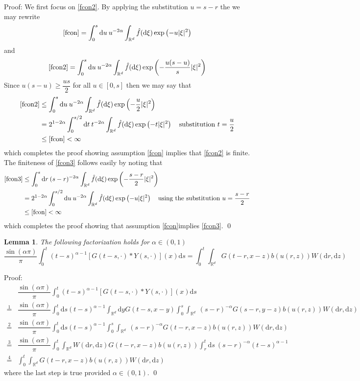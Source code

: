 \documentclass{article}
\newtheorem{lemma}{Lemma}[section]
\numberwithin{equation}{section}
\newcommand{\R}{\mathbb{R}}
\newcommand{\ud}{\ensuremath{\mathrm{d}}}
\begin{document}
Proof: We first focus on \eqref{fcon2}. By applying the substitution $u=s-r$ the we may rewrite 
$$ \ref{fcon} = \int_0^s \ud u \: u^{-2\alpha} \int_{\R^d} \hat{f}(\ud \xi) \exp\left( -u|\xi|^2 \right)  $$ 
and 
$$ \eqref{fcon2} = \int_0^s \ud u \: u^{-2\alpha} \int_{\R^d} \hat{f}(\ud \xi) \exp\left( -\dfrac{u(s-u)}{s}|\xi|^2 \right)$$
Since $u(s-u) \ge \dfrac{us}{2}$ for all $u\in[0,s]$ then we may say that 
\begin{align*} \eqref{fcon2} &\le \int_0^s \ud u \: u^{-2\alpha} \int_{\R^d} \hat{f}(\ud \xi) \exp\left( -\dfrac{u}{2}|\xi|^2 \right) 
\\ &= 2^{1-2\alpha}\int_0^{s/2} \ud t \: t^{-2\alpha} \int_{\R^d} \hat{f}(\ud \xi) \exp\left( -t|\xi|^2 \right) \quad \text{substitution $t=\dfrac{u}{2}$}
\\& \le \ref{fcon} < \infty  \end{align*}
which completes the proof showing assumption \ref{fcon} implies that \eqref{fcon2} is finite. The finiteness of \eqref{fcon3} follows easily by noting that 
\begin{align*}
\eqref{fcon3} &\le \int_0^s \ud r \: (s-r)^{-2\alpha} \int_{\R^d} \hat{f}(\ud \xi) \exp\left(-\dfrac{s-r}{2}|\xi|^2 \right)
\\ &= 2^{1-2\alpha}\int_0^{s/2} \ud u \: u^{-2\alpha} \int_{\R^d} \hat{f}(\ud \xi) \exp\left(-u|\xi|^2 \right) \quad \text{using the substitution $u=\dfrac{s-r}{2}$}
\\ & \le \ref{fcon} < \infty
\end{align*}
which completes the proof showing that assumption \ref{fcon}implies \eqref{fcon3}. \qed 

\begin{lemma} \textit{The following factorization holds for $\alpha \in (0,1)$  
\begin{equation}
\dfrac{\sin(\alpha \pi)}{\pi}\int_0^t(t-s)^{\alpha-1}\left[G(t-s,\cdot)*Y(s,\cdot)\right](x) \ud s = \int_0^t  \int_{\R^d} G(t-r,x-z)b(u(r,z)) W(\ud r,\ud z) \label{fac}
\end{equation} } 
\end{lemma}

Proof: 
\begin{align*}
&\dfrac{\sin(\alpha \pi)}{\pi}\int_0^t(t-s)^{\alpha-1}\left[G(t-s,\cdot)*Y(s,\cdot)\right](x) \ud s \\
\stackrel{1}{=}&\dfrac{\sin(\alpha \pi)}{\pi}\int_0^t \ud s (t-s)^{\alpha-1}\int_{\R^d} \ud y G(t-s,x-y)
\int_0^s \int_{\R^d} \: (s-r)^{-\alpha}G(s-r,y-z)b(u(r,z))W(\ud r,\ud z)\\
\stackrel{2}{=}& \dfrac{\sin(\alpha \pi)}{\pi}\int_0^t \ud s (t-s)^{\alpha-1}
\int_0^s \int_{\R^d} \: (s-r)^{-\alpha}G(t-r,x-z)b(u(r,z))W(\ud r,\ud z)\\
\stackrel{3}{=}& \dfrac{\sin(\alpha \pi)}{\pi}
\int_0^t  \int_{\R^d} W(\ud r,\ud z)G(t-r,x-z)b(u(r,z)) 
\int_r^t \ud s\: (s-r)^{-\alpha} (t-s)^{\alpha-1} \\
\stackrel{4}{=}& \int_0^t  \int_{\R^d} G(t-r,x-z)b(u(r,z)) W(\ud r,\ud z)
\end{align*}
where the last step is true provided $\alpha\in (0,1)$. \qed 
\end{document}
